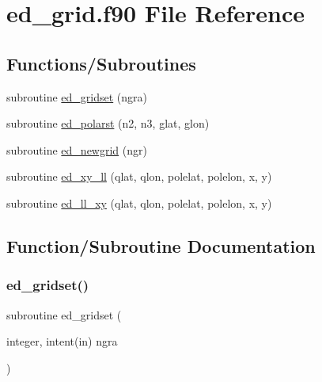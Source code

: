 \hypertarget{ed__grid_8f90}{}\section{ed\+\_\+grid.\+f90 File Reference}
\label{ed__grid_8f90}
\subsection*{Functions/\+Subroutines}
\begin{DoxyCompactItemize}
\item 
subroutine \hyperlink{ed__grid_8f90_a634ac391a90a7bba5c99f2654da64652}{ed\+\_\+gridset} (ngra)
\item 
subroutine \hyperlink{ed__grid_8f90_a086bde332f24bfe809a5abbdeef98c55}{ed\+\_\+polarst} (n2, n3, glat, glon)
\item 
subroutine \hyperlink{ed__grid_8f90_a91112e6806db1100d405228002308384}{ed\+\_\+newgrid} (ngr)
\item 
subroutine \hyperlink{ed__grid_8f90_a6e6353b40d999c1efa25011506d4cca3}{ed\+\_\+xy\+\_\+ll} (qlat, qlon, polelat, polelon, x, y)
\item 
subroutine \hyperlink{ed__grid_8f90_a1e00cf0eabe83f2cc3c5d9ab15c730fb}{ed\+\_\+ll\+\_\+xy} (qlat, qlon, polelat, polelon, x, y)
\end{DoxyCompactItemize}


\subsection{Function/\+Subroutine Documentation}
\mbox{\label{ed__grid_8f90_a634ac391a90a7bba5c99f2654da64652}} 
\subsubsection{\texorpdfstring{ed\+\_\+gridset()}{ed\_gridset()}}
{\footnotesize\ttfamily subroutine ed\+\_\+gridset (\begin{DoxyParamCaption}\item[{integer, intent(in)}]{ngra }\end{DoxyParamCaption})}

